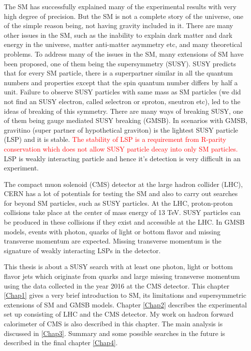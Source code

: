 The SM has successfully explained many of the experimental results with very high degree of precision. But the SM is not a complete story of the universe, one of the simple reason being, not having gravity included in it. There are many other issues in the SM, such as the inability to explain dark matter and dark energy in the universe, matter anti-matter asymmetry etc, and many theoretical problems. To address many of the issues in the SM, many extensions of SM have been proposed, one of them being the supersymmetry (SUSY). SUSY predicts that for every SM particle, there is a superpartner similar in all the quantum numbers and properties except that the spin quantum number differs by half a unit. Failure to observe SUSY particles with same mass as SM particles (we did not find an SUSY electron, called selectron or sproton, sneutron etc), led to the ideas of breaking of this symmetry. There are many ways of breaking SUSY, one of them being gauge mediated SUSY breaking (GMSB). In scenarios with GMSB, gravitino (super partner of hypothetical graviton) is the lightest SUSY particle (LSP) and it is stable. \textcolor{red}{The stability of LSP is a requirement from R-parity conservation which does not allow SUSY particle decay into only SM particles.} LSP is weakly interacting particle and hence it's detection is very difficult in an experiment.

The compact muon solenoid (CMS) detector at the large hadron collider (LHC), CERN has a lot of potentials for testing the SM and also to carry out searches for beyond SM particles, such as SUSY particles. At the LHC, proton-proton collisions take place at the center of mass energy of 13 TeV. SUSY particles can be produced in these collisions if they exist and accessible at the LHC. In GMSB models, events with photon, quarks of light or bottom flavor and missing transverse momentum are expected. Missing transverse momentum is the signature of weakly interacting LSPs in the detector.

This thesis is about a SUSY search with at least one photon, light or bottom flavor jets which originate from quarks and large missing transverse momentum using the data collected in the year 2016 at the CMS detector. This chapter \ref{Chap1} gives a very brief introduction to SM, its limitations and supersymmetric extensions of SM and GMSB models. Chapter \ref{Chap2} describes the experimental set up consisting of LHC and the CMS detector. My work on hadron forward calorimeter of CMS is also described in this chapter.  The main analysis is discussed in \ref{Chap3}. Summary and some possible searches in the future is described in the final chapter \ref{Chap4}.


